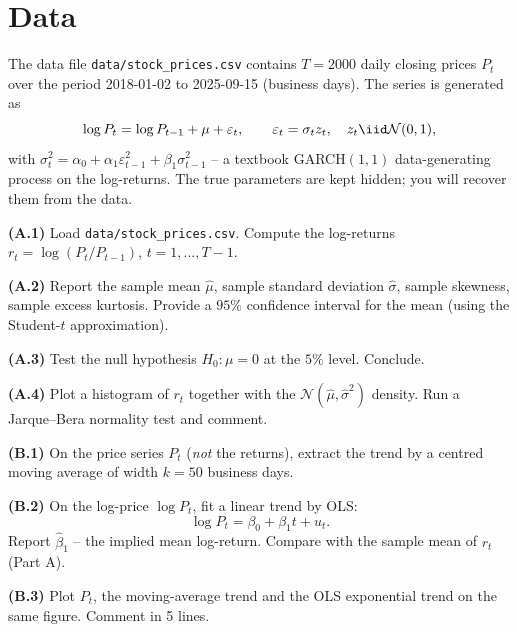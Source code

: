 \documentclass[a4paper,11pt]{article}
\begin{document}
\section*{Data}

The data file \texttt{data/stock\_prices.csv} contains $T = 2000$
daily closing prices $P_t$ over the period 2018-01-02 to 2025-09-15
(business days). The series is generated as
\[
  \log P_t = \log P_{t-1} + \mu + \varepsilon_t,
  \qquad
  \varepsilon_t = \sigma_t z_t,
  \quad z_t \iid \mathcal N(0, 1),
\]
with $\sigma_t^2 = \alpha_0 + \alpha_1 \varepsilon_{t-1}^2 + \beta_1
\sigma_{t-1}^2$ -- a textbook GARCH$(1, 1)$ data-generating process
on the log-returns. The true parameters are kept hidden; you will
recover them from the data.

\begin{exercise}
\textbf{(A.1)} Load \texttt{data/stock\_prices.csv}. Compute the
log-returns $r_t = \log(P_t / P_{t-1})$, $t = 1, \dots, T-1$.

\textbf{(A.2)} Report the sample mean $\widehat\mu$, sample
standard deviation $\widehat\sigma$, sample skewness, sample
excess kurtosis. Provide a $95\%$ confidence interval for the
mean (using the Student-$t$ approximation).

\textbf{(A.3)} Test the null hypothesis $H_0: \mu = 0$ at the $5\%$
level. Conclude.

\textbf{(A.4)} Plot a histogram of $r_t$ together with the
$\mathcal N(\widehat\mu, \widehat\sigma^2)$ density. Run a
Jarque--Bera normality test and comment.
\end{exercise}

\begin{exercise}
\textbf{(B.1)} On the price series $P_t$ (\emph{not} the returns),
extract the trend by a centred moving average of width $k = 50$
business days.

\textbf{(B.2)} On the log-price $\log P_t$, fit a linear trend by
OLS:
\[
  \log P_t = \beta_0 + \beta_1 t + u_t.
\]
Report $\widehat\beta_1$ -- the implied mean log-return. Compare
with the sample mean of $r_t$ (Part A).

\textbf{(B.3)} Plot $P_t$, the moving-average trend and the OLS
exponential trend on the same figure. Comment in 5 lines.
\end{exercise}
\end{document}
